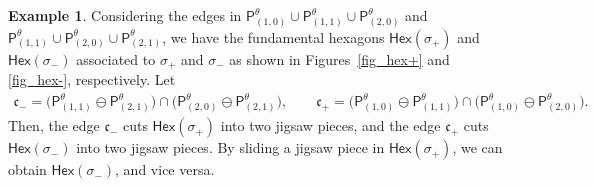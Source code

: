 \documentclass[pdftex]{sigma}
\numberwithin{equation}{section}
\theoremstyle{definition}
\newtheorem{Example}[Theorem]{Example}
\newcommand{\fkc}{\mathfrak{c}}
\newcommand{\sfP}{\mathsf{P}}
\newcommand{\Hex}{\mathsf{Hex}}
\begin{document}
\begin{Example}
Considering the edges in $\sfP^\theta_{(1,0)}\cup\sfP^\theta_{(1,1)}\cup\sfP^\theta_{(2,0)}$ and
$\sfP^\theta_{(1,1)}\cup\sfP^\theta_{(2,0)}\cup\sfP^\theta_{(2,1)}$,
we have the fundamental hexagons $\Hex(\sigma_+)$ and $\Hex(\sigma_-)$ associated to
$\sigma_+$ and $\sigma_-$ as shown in Figures~\ref{fig_hex+} and \ref{fig_hex-}, respectively.
Let
\begin{gather*}
\fkc_-=\bigl(\sfP^\theta_{(1,1)}\ominus\sfP^\theta_{(2,1)}\bigr)\cap\bigl(\sfP^\theta_{(2,0)}\ominus\sfP^\theta_{(2,1)}\bigr) , \qquad
\fkc_+=\bigl(\sfP^\theta_{(1,0)}\ominus\sfP^\theta_{(1,1)}\bigr)\cap\bigl(\sfP^\theta_{(1,0)}\ominus\sfP^\theta_{(2,0)}\bigr).
\end{gather*}
Then, the edge $\fkc_-$ cuts $\Hex(\sigma_+)$ into two jigsaw pieces, and the edge $\fkc_+$ cuts $\Hex(\sigma_-)$ into two jigsaw pieces.
By sliding a jigsaw piece in $\Hex(\sigma_+)$, we can obtain $\Hex(\sigma_-)$, and vice versa.

\newcommand{\jigsawbasicsetting}{
\foreach \n/\a/\b in {1/1.5/3, 2/3.5/3, 3/5.5/3, 4/7.5/3} {\coordinate (00B\n) at (\a,\b);}
\foreach \n/\a/\b in {1/0.5/1,2/2.5/1, 3/4.5/1, 4/6.5/1} {\coordinate (00W\n) at (\a,\b);}
\foreach \n/\a/\b in {1/1.5/3, 2/3.5/3, 3/5.5/3, 4/7.5/3} {\coordinate (10B\n) at (\a+8,\b);}
\foreach \n/\a/\b in {1/0.5/1,2/2.5/1, 3/4.5/1, 4/6.5/1} {\coordinate (10W\n) at (\a+8,\b);}
\foreach \n/\a/\b in {1/1.5/3, 2/3.5/3, 3/5.5/3, 4/7.5/3} {\coordinate (01B\n) at (\a,\b+4);}
\foreach \n/\a/\b in {1/0.5/1,2/2.5/1, 3/4.5/1, 4/6.5/1} {\coordinate (01W\n) at (\a,\b+4);}
\foreach \n/\a/\b in {1/1.5/3, 2/3.5/3, 3/5.5/3, 4/7.5/3} {\coordinate (11B\n) at (\a+8,\b+4);}
\foreach \n/\a/\b in {1/0.5/1,2/2.5/1, 3/4.5/1, 4/6.5/1} {\coordinate (11W\n) at (\a+8,\b+4);}
\foreach \n/\a/\b in {1/1.5/3, 2/3.5/3, 3/5.5/3, 4/7.5/3} {\coordinate (02B\n) at (\a,\b+8);}
\foreach \n/\a/\b in {1/0.5/1,2/2.5/1, 3/4.5/1, 4/6.5/1} {\coordinate (02W\n) at (\a,\b+8);}
\foreach \n/\a/\b in {1/1.5/3, 2/3.5/3, 3/5.5/3, 4/7.5/3} {\coordinate (12B\n) at (\a+8,\b+8);}
\foreach \n/\a/\b in {1/0.5/1,2/2.5/1, 3/4.5/1, 4/6.5/1} {\coordinate (12W\n) at (\a+8,\b+8);}
\coordinate (exB) at (7.5,-1); \coordinate (exW) at (16.5,5);
}


\end{Example}
\end{document}
